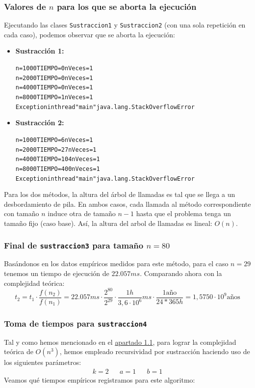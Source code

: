 \documentclass[12pt,a4paper]{article}
\newcounter{unit}[section]
\newcounter{chapter}[unit]
\renewcommand{\thesubsubsection}{\arabic{chapter}.\arabic{subsubsection}.}
\newcommand{\result}[1]{%
  \subsubsection{#1}%
  \label{result:\thesubsubsection}
}
\begin{document}
\newpage
\result{Valores de \texorpdfstring{$n$}{n} para los que se aborta la ejecución}
\hspace{3mm} Ejecutando las clases \texttt{Sustraccion1} y \texttt{Sustraccion2} (con una sola repetición en cada caso), podemos observar que se aborta la ejecución:

\begin{itemize}
  \item \textbf{Sustracción 1:} \\[-4ex]
  \begin{alltt}
 n=1000 TIEMPO=0  nVeces=1
 n=2000 TIEMPO=0  nVeces=1
 n=4000 TIEMPO=0  nVeces=1
 n=8000 TIEMPO=1  nVeces=1
 \textcolor{Firebrick2}{Exception in thread "main" java.lang.StackOverflowError}
\end{alltt}

\item \textbf{Sustracción 2:} \\[-4ex]
\begin{alltt}
 n=1000 TIEMPO=6  nVeces=1
 n=2000 TIEMPO=27  nVeces=1
 n=4000 TIEMPO=104  nVeces=1
 n=8000 TIEMPO=400  nVeces=1
 \textcolor{Firebrick2}{Exception in thread "main" java.lang.StackOverflowError}
\end{alltt}
\end{itemize}

Para los dos métodos, la altura del árbol de llamadas es tal que se llega a un desbordamiento de pila. En ambos casos, cada llamada al método correspondiente con tamaño $n$ induce otra de tamaño $n-1$ hasta que el problema tenga un tamaño fijo (caso base). Así, la altura del arbol de llamadas es lineal: $O(n)$.

\vspace{6mm}
\result{Final de \texttt{sustraccion3} para tamaño \texorpdfstring{$n=80$}{n=80}}
\hspace{3mm} Basándonos en los datos empíricos medidos para este método, para el caso $n=29$ tenemos un tiempo de ejecución de $22.057ms$. Comparando ahora con la complejidad teórica:
$$t_2 = t_1 \cdot \frac{f(n_2)}{f(n_1)} = 22.057ms \cdot \frac{2^{80}}{2^{29}}\cdot\frac{1h}{3,6 \cdot 10^6}ms \cdot \frac{1\text{año}}{24*365h}= 1,5750 \cdot 10^9 \text{años}$$

\newpage
\result{Toma de tiempos para \texttt{sustraccion4}}
\hspace{3mm} Tal y como hemos mencionado en el \hyperref[result:1.1.]{apartado 1.1}, para lograr la complejidad teórica de $O(n^3)$, hemos empleado recursividad por sustracción haciendo uso de los siguientes parámetros:
\begin{align*}
    k = 2 && a = 1 && b =1
\end{align*}
Veamos qué tiempos empíricos registramos para este algoritmo:
\end{document}
